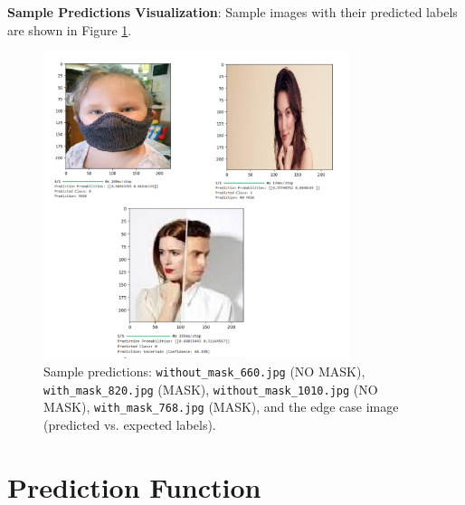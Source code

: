\documentclass[a4paper,12pt]{article}
\begin{document}
\textbf{Sample Predictions Visualization}: Sample images with their predicted labels are shown in Figure \ref{fig:sample_predictions}.
\begin{figure}[h]
    \centering
    \includegraphics[width=0.8\textwidth]{sample_predictions}
    \caption{Sample predictions: \texttt{without\_mask\_660.jpg} (NO MASK), \texttt{with\_mask\_820.jpg} (MASK), \texttt{without\_mask\_1010.jpg} (NO MASK), \texttt{with\_mask\_768.jpg} (MASK), and the edge case image (predicted vs. expected labels).}
    \label{fig:sample_predictions}
\end{figure}

\section{Prediction Function}
\end{document}
